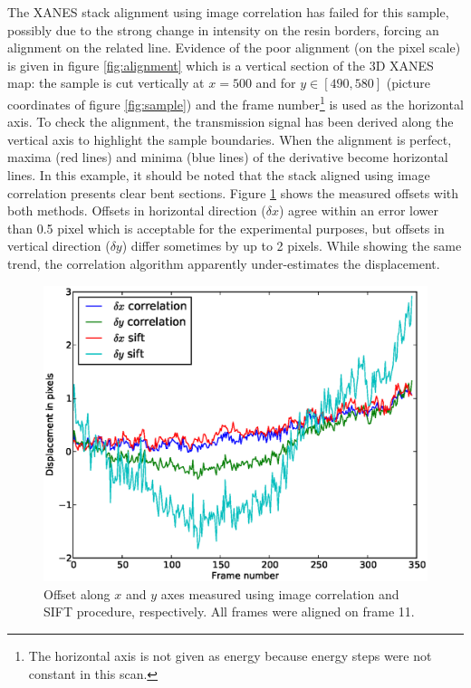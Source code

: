 \documentclass[preprint]{iucr}
\begin{document}
The XANES stack alignment using image correlation has failed for this sample,
possibly due to the strong change in intensity on the resin borders, forcing an
alignment on the related line. Evidence of the poor alignment (on the
pixel scale) is given in figure \ref{fig:alignment} which is a vertical
section of the 3D XANES map: the sample is cut vertically at $x=500$ and for
$y\in[490, 580]$ (picture coordinates of figure \ref{fig:sample}) and the frame number\footnote{The
horizontal axis is not given as energy because energy steps were not
constant in this scan.} is used as the horizontal axis.
To check the alignment, the transmission signal has been derived along the
vertical axis to highlight the sample boundaries.
When the alignment is perfect, maxima (red lines) and minima (blue lines) of
the derivative become horizontal lines.
In this example, it should be noted that the stack aligned using image
correlation presents clear bent sections.
Figure \ref{fig:offset} shows the measured offsets with both methods.
Offsets in horizontal direction ($\delta x$) agree within an error
lower than 0.5 pixel which is acceptable for the experimental purposes, but
offsets in vertical direction ($\delta y$) differ sometimes by up to 2 pixels.
While showing the same trend, the correlation algorithm apparently
under-estimates the displacement.

\begin{figure}
\label{fig:offset}
\begin{center}
\includegraphics[width=15cm]{offset.eps}
\caption{Offset along $x$ and $y$ axes measured using image correlation and
SIFT procedure, respectively. All frames were aligned on frame 11.}
\end{center}
\end{figure}
\end{document}
